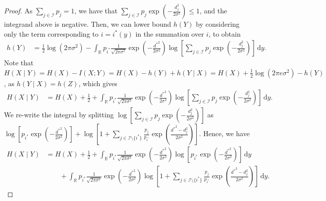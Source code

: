\documentclass[10pt,a4paper]{amsart}
\newcommand{\bbR}{\mathbb{R}}
\newcommand{\calI}{\mathcal{I}}
\newcommand{\intR}{\int_{\bbR}}
\renewcommand{\d}{\,\mathrm{d}}
\begin{document}
\begin{proof}[Proof]
		As $\sum_{j \in \calI} p_j = 1$, we have that $\sum_{j \in \calI} p_j \exp\left(-\tfrac{d_j^2}{2\sigma^2}\right)  \leq 1$, and the integrand above is negative.
		Then, we can lower bound $h(Y)$ by considering only the term corresponding to $i = i^*(y)$ in the summation over $i$, to obtain
		\begin{align*}
			h(Y) &= \frac12\log(2\pi\sigma^2) - \intR p_{i^*} \tfrac{1}{\sqrt{2\pi \sigma^2}}\exp\left(-\tfrac{{d^*}^2}{2\sigma^2}\right) \log \left[\sum_{j \in \calI} p_j \exp\left(-\tfrac{d_j^2}{2\sigma^2}\right) \right]\d y.
		\end{align*}
		Note that $H(X \mid Y) = H(X) - I(X;Y) = H(X) - h(Y) + h(Y \mid X) = H(X) + \frac{1}{2}\log(2\pi e \sigma^2) - h(Y)$, as $h(Y \mid  X) = h(Z)$, which gives
		\begin{align}
			H(X \mid Y) &= H(X) + \frac12 + \intR p_{i^*} \tfrac{1}{\sqrt{2\pi \sigma^2}}\exp\left(-\tfrac{{d^*}^2}{2\sigma^2}\right) \log \left[\sum_{j \in \calI} p_j \exp\left(-\tfrac{d_j^2}{2\sigma^2}\right) \right]\d y . \label{eqn: h_x_y}
		\end{align}
		We re-write the integral by splitting $\log \left[\sum_{j \in \calI} p_j \exp\left(-\tfrac{d_j^2}{2\sigma^2}\right)\right]$ as $\log \left[p_{i^*} \exp\left(-\tfrac{{d^*}^2}{2\sigma^2}\right)\right] + \log \left[1 + \sum_{j\in \calI \setminus \{i^*\}} \frac{p_j}{p_{i^*}} \exp\left(\tfrac{{d^*}^2-d_j^2}{2\sigma^2}\right)\right]$. Hence, we have
		\begin{align}
			H(X \mid Y) &= H(X) + \frac12 + \intR p_{i^*} \tfrac{1}{\sqrt{2\pi \sigma^2}}\exp\left(-\tfrac{{d^*}^2}{2\sigma^2}\right) \log \left[p_{i^*} \exp\left(-\tfrac{{d^*}^2}{2\sigma^2}\right)\right]\d y  \nonumber \\
			&\qquad + \intR p_{i^*} \tfrac{1}{\sqrt{2\pi \sigma^2}}\exp\left(-\tfrac{{d^*}^2}{2\sigma^2}\right) \log \left[1 + \sum_{j\in \calI \setminus \{i^*\}} \frac{p_j}{p_{i^*}} \exp\left(\tfrac{{d^*}^2-d_j^2}{2\sigma^2}\right)\right] \d y. \label{eqn: h_x_y_ub}
		\end{align}
		

\end{proof}
\end{document}
